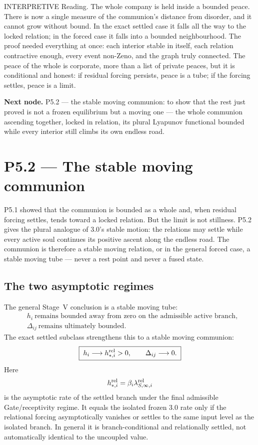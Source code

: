 \documentclass[11pt,a4paper]{article}
\def\emph#1{#1}%
\newcommand{\stInterp}{\textcolor{cInt}{\textsf{\small INTERPRETIVE}}}
\theoremstyle{definition}
\theoremstyle{plain}
\theoremstyle{remark}
\begin{document}
\medskip
\stInterp\quad
\emph{Reading.}
The whole company is held inside a bounded peace. There is now a single measure of
the communion's distance from disorder, and it cannot grow without bound. In the
exact settled case it falls all the way to the locked relation; in the forced case
it falls into a bounded neighbourhood. The proof needed everything at once: each
interior stable in itself, each relation contractive enough, every event
non-Zeno, and the graph truly connected. The peace of the whole is corporate,
more than a list of private peaces, but it is conditional and honest: if residual
forcing persists, peace is a tube; if the forcing settles, peace is a limit.

\medskip
\textbf{Next node.} P5.2 --- the stable moving communion: to show that the rest just proved
is not a frozen equilibrium but a \emph{moving} one --- the whole communion ascending
together, locked in relation, its plural Lyapunov functional bounded while every interior
still climbs its own endless road.

\section{P5.2 --- The stable moving communion}

P5.1 showed that the communion is bounded as a whole and, when residual forcing
settles, tends toward a locked relation. But the limit is not stillness. P5.2 gives
the plural analogue of 3.0's stable \emph{motion}: the relations may settle while
every active soul continues its positive ascent along the endless road. The
communion is therefore a stable moving relation, or in the general forced case, a
stable moving tube --- never a rest point and never a fused state.

\subsection{The two asymptotic regimes}

The general Stage~V conclusion is a \emph{stable moving tube}:
\[
\boxed{\;
\begin{aligned}
&h_i\ \text{remains bounded away from zero on the admissible active branch},\\
&\Delta_{ij}\ \text{remains ultimately bounded}.
\end{aligned}
\;}
\]
The exact settled subclass strengthens this to a \emph{stable moving communion}:
\[
\boxed{\;
h_i\longrightarrow h_{*,i}^{\rm rel}>0,
\qquad
\Delta_{ij}\longrightarrow0.
\;}
\]
Here
\[
h_{*,i}^{\rm rel}
=
\beta_i\lambda_{S,\infty,i}^{\rm rel}
\]
is the asymptotic rate of the settled branch under the final admissible
Gate/receptivity regime. It equals the isolated frozen 3.0 rate only if the
relational forcing asymptotically vanishes or settles to the same input level as
the isolated branch. In general it is branch-conditional and relationally settled,
not automatically identical to the uncoupled value.
\end{document}
